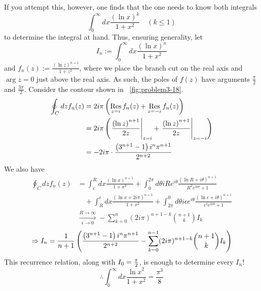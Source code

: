 If you attempt this, however, one finds that the one needs to know both integrals
\[
	\int_0^\infty dx \frac{\left(\ln x\right)^k}{1+x^2} \quad (k \le 1)
\]
to determine the integral at hand.
Thus, ensuring generality, let
\[
	I_n := \int_0^\infty dx \frac{\left(\ln x\right)^n}{1+x^2}
\]
and $f_n(z) := \frac{{\left( \ln z \right)}^{n+1}}{1 + z^2}$,
where we place the branch cut on the real axis and $\arg z = 0$ just above the real axis.
As such, the poles of $f(z)$ have arguments $\frac{\pi}{2}$ and $\frac{3\pi}{2}$.
Consider the contour shown in ~\ref{fig:problem3-18}.
\begin{align*}
	\oint_C dz f_n(z)
	&= 2i\pi \left( \mathop{\mathrm{Res}}_{z=i} f_n(z) + \mathop{\mathrm{Res}}_{z=-i} f_n(z) \right) \\
	&= 2i\pi \left( {\left. \frac{{\left( \ln z \right)}^{n+1}}{2z} \right|}_{z=i} + {\left. \frac{{\left( \ln z \right)}^{n+1}}{2z} \right|}_{z=-i} \right) \\
	&= -2i\pi \cdot \frac{\left(3^{n+1}-1\right) i^n \pi^{n+1}}{2^{n+2}}
\end{align*}
We also have
\begin{align*}
    \oint_C dz f_n(z)
    &= \int_\epsilon^R dx \frac{{\left( \ln x \right)}^{n+1}}{1 +x^2}
     + \int_0^{2\pi} d\theta iRe^{i\theta} \frac{{\left( \ln R + i\theta\right)}^{n+1}}{R^2 e^{2i\theta} + 1} \\
    &\quad + \int_R^\epsilon dx \frac{{\left( \ln x + 2i\pi \right)}^{n+1}}{1 + x^2}
     + \int_{2\pi}^0 d\theta i\epsilon e^{i\theta} \frac{{\left(\ln\epsilon + i\theta\right)}^{n+1}}{\epsilon^2 e^{2i\theta} + 1} \\
    &\xrightarrow[\epsilon \rightarrow 0]{R \rightarrow \infty}
        -\sum_{k=0}^n (2i\pi)^{n+1-k} \binom{n+1}{k} I_k
\end{align*}
\[
	\Rightarrow I_n = \frac{1}{n+1} \left(
		\frac{\left(3^{n+1}-1\right) i^n \pi^{n+1}}{2^{n+2}} - \sum_{k=0}^{n-1} (2i\pi)^{n+1-k} \binom{n+1}{k} I_k
	\right)
\]
This recurrence relation, along with $I_0 = \frac{\pi}{2}$, is enough to determine every $I_n$!
\[
	\therefore \int_0^\infty dx \frac{{\ln x}^2}{1 + x^2} = \frac{\pi^3}{8}
\]

